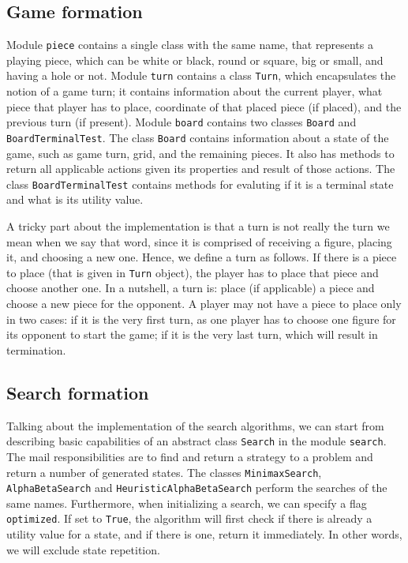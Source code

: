 \documentclass[paper=a4, fontsize=11pt]{article} %
\begin{document}
\subsection{Game formation}

Module \verb|piece| contains a single class with the same name, that represents a playing piece, which can be white or black, round or square, big or small, and having a hole or not. Module \verb|turn| contains a class \verb|Turn|, which encapsulates the notion of a game turn; it contains information about the current player, what piece that player has to place, coordinate of that placed piece (if placed), and the previous turn (if present). Module \verb|board| contains two classes \verb|Board| and \verb|BoardTerminalTest|. The class \verb|Board| contains information about a state of the game, such as game turn, grid, and the remaining pieces. It also has methods to return all applicable actions given its properties and result of those actions. The class \verb|BoardTerminalTest| contains methods for evaluting if it is a terminal state and what is its utility value.

A tricky part about the implementation is that a turn is not really the turn we mean when we say that word, since it is comprised of receiving a figure, placing it, and choosing a new one. Hence, we define a turn as follows. If there is a piece to place (that is given in \verb|Turn| object), the player has to place that piece and choose another one. In a nutshell, a turn is: place (if applicable) a piece and choose a new piece for the opponent. A player may not have a piece to place only in two cases: if it is the very first turn, as one player has to choose one figure for its opponent to start the game; if it is the very last turn, which will result in termination.

\subsection{Search formation}

Talking about the implementation of the search algorithms, we can start from describing basic capabilities of an abstract class \verb|Search| in the module \verb|search|. The mail responsibilities are to find and return a strategy to a problem and return a number of generated states. The classes \verb|MinimaxSearch|, \verb|AlphaBetaSearch| and \verb|HeuristicAlphaBetaSearch| perform the searches of the same names. Furthermore, when initializing a search, we can specify a flag \verb|optimized|. If set to \verb|True|, the algorithm will first check if there is already a utility value for a state, and if there is one, return it immediately. In other words, we will exclude state repetition. 
\end{document}
